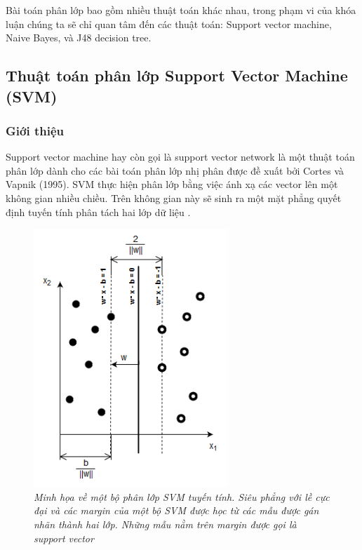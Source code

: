 Bài toán phân lớp bao gồm nhiều thuật toán khác nhau, trong phạm vi của khóa luận chúng ta sẽ chỉ quan tâm đến các thuật toán: Support vector machine, Naive Bayes, và J48 decision tree.
\subsection{Thuật toán phân lớp Support Vector Machine (SVM)}
\subsubsection{Giới thiệu}
Support vector machine hay còn gọi là support vector network là một thuật toán phân lớp dành cho các bài toán phân lớp nhị phân được đề xuất bởi Cortes và Vapnik (1995). SVM thực hiện phân lớp bằng việc ánh xạ các vector lên một không gian nhiều chiều. Trên không gian này sẽ sinh ra một mặt phẳng quyết định tuyến tính phân tách hai lớp dữ liệu \cite{Cortes1995}.
	\begin{figure}[H]
    \centering
			\includegraphics[width=0.65\textwidth]{linearSVM.png}
      \caption{\textit{Minh họa về một bộ phân lớp SVM tuyến tính. Siêu phẳng với lề cực đại và các margin của một bộ SVM được học từ các mẫu được gán nhãn thành hai lớp. Những mẫu nằm trên margin được gọi là support vector}}
	\end{figure}
